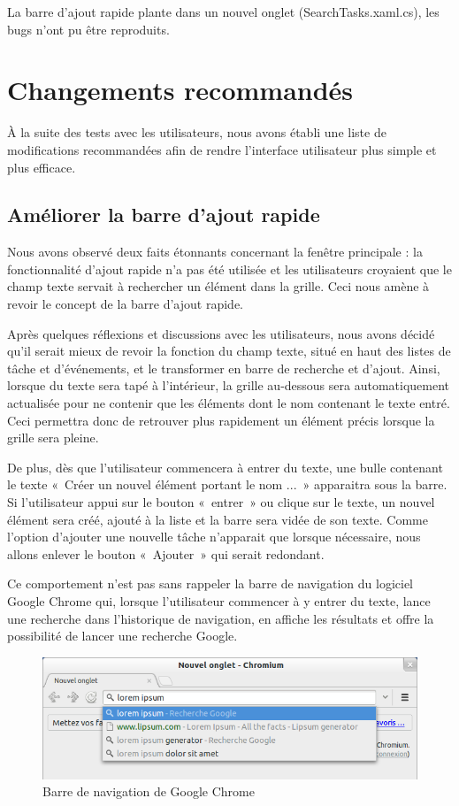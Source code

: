 \documentclass[letterpaper, oneside, 12pt, these, creativecommons]{thETS}
\begin{document}
La barre d'ajout rapide plante dans un nouvel onglet (SearchTasks.xaml.cs), les bugs n'ont pu être reproduits.

\chapter{Changements recommandés}

À la suite des tests avec les utilisateurs, nous avons établi une liste de modifications recommandées afin de rendre l'interface utilisateur plus simple et plus efficace.

\section{Améliorer la barre d'ajout rapide}

Nous avons observé deux faits étonnants concernant la fenêtre principale : la fonctionnalité d'ajout rapide n'a pas été utilisée et les utilisateurs croyaient que le champ texte servait à rechercher un élément dans la grille. Ceci nous amène à revoir le concept de la barre d'ajout rapide.

Après quelques réflexions et discussions avec les utilisateurs, nous avons décidé qu'il serait mieux de revoir la fonction du champ texte, situé en haut des listes de tâche et d'événements, et le transformer en barre de recherche et d'ajout. Ainsi, lorsque du texte sera tapé à l'intérieur, la grille au-dessous sera automatiquement actualisée pour ne contenir que les éléments dont le nom contenant le texte entré. Ceci permettra donc de retrouver plus rapidement un élément précis lorsque la grille sera pleine.

De plus, dès que l'utilisateur commencera à entrer du texte, une bulle contenant le texte « Créer un nouvel élément portant le nom ... » apparaitra sous la barre. Si l'utilisateur appui sur le bouton « entrer » ou clique sur le texte, un nouvel élément sera créé, ajouté à la liste et la barre sera vidée de son texte. Comme l'option d'ajouter une nouvelle tâche n'apparait que lorsque nécessaire, nous allons enlever le bouton « Ajouter » qui serait redondant.

Ce comportement n'est pas sans rappeler la barre de navigation du logiciel Google Chrome qui, lorsque l'utilisateur commencer à y entrer du texte, lance une recherche dans l'historique de navigation, en affiche les résultats et offre la possibilité de lancer une recherche Google.

\begin{figure}
    \includegraphics[scale=0.5]{barre_de_navigation_google_chrome.png}
    \caption{Barre de navigation de Google Chrome}
\end{figure}
\end{document}
